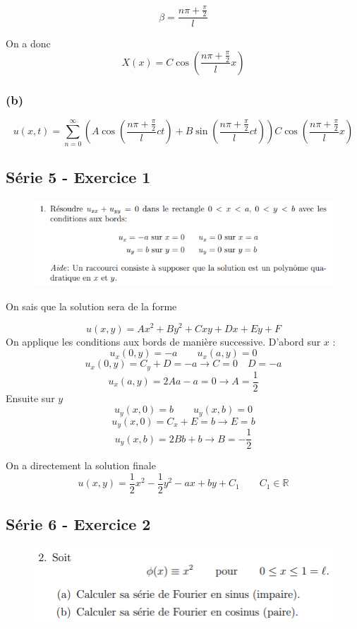 \documentclass[resume]{subfiles}
\begin{document}
\begin{multicols}{2}
$$\beta =\frac{n\pi+\frac{\pi}{2}}{l}$$

On a donc
$$X(x)=C\cos\left(\frac{n\pi+\frac{\pi}{2}}{l} x\right)$$
\subsubsection{(b)}
$$u(x,t)=\sum_{n=0}^{\infty}\left(A\cos\left(\frac{n\pi+\frac{\pi}{2}}{l} ct\right)+B\sin\left(\frac{n\pi+\frac{\pi}{2}}{l} ct\right)\right)C\cos\left(\frac{n\pi+\frac{\pi}{2}}{l} x\right)$$
\subsection{Série 5 - Exercice 1}
\label{S5E1}
\begin{figure}[H]
\centering
\includegraphics[scale=0.5]{img_14.png}
\end{figure}
On sais que la solution sera de la forme

$$u(x,y)=Ax^2+By^2+Cxy+Dx+Ey+F$$
On applique les conditions aux bords de manière successive. D'abord sur $x$ :
$$u_x(0,y)=-a\qquad u_x(a,y)=0$$
$$u_x(0,y)=C_y+D=-a\longrightarrow \boxed{C=0}\quad \boxed{D=-a}$$
$$u_x(a,y)=2Aa-a=0\longrightarrow \boxed{A=\frac{1}{2}}$$
Ensuite sur $y$
$$u_y(x,0)=b\qquad u_y(x,b)=0$$
$$u_y(x,0)=C_x+E=b\longrightarrow \boxed{E=b}$$
$$u_y(x,b)=2Bb+b\longrightarrow \boxed{B=-\frac{1}{2}}$$

On a directement la solution finale
$$\boxed{u(x,y)=\frac{1}{2}x^2-\frac{1}{2}y^2-ax+by+C_1\qquad C_1\in\mathbb{R}}$$
\subsection{Série 6 - Exercice 2}
\label{S6E2}
\begin{figure}[H]
\centering
\includegraphics[scale=0.5]{img_15.png}
\end{figure}

\end{multicols}
\end{document}
